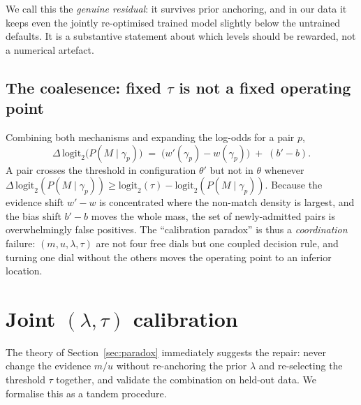 \documentclass[conference]{IEEEtran}
\begin{document}
We call this the \emph{genuine residual}: it survives prior anchoring, and in our data it
keeps even the jointly re-optimised trained model slightly below the untrained defaults.
It is a substantive statement about which levels should be rewarded, not a numerical
artefact.

\subsection{The coalesence: fixed $\tau$ is not a fixed operating point}
Combining both mechanisms and expanding the log-odds for a pair $p$,
\begin{equation}
\Delta\,\mathrm{logit}_2\bigl(P(M\mid\gamma_p)\bigr)
\;=\;\bigl(w'(\gamma_p)-w(\gamma_p)\bigr)\;+\;(b'-b).
\label{eq:delta}
\end{equation}
A pair crosses the threshold in configuration $\theta'$ but not in $\theta$ whenever
$\Delta\,\mathrm{logit}_2(P(M\mid\gamma_p))\ge
\mathrm{logit}_2(\tau)-\mathrm{logit}_2(P(M\mid\gamma_p))$. Because the evidence shift
$w'-w$ is concentrated where the non-match density is largest, and the bias shift $b'-b$
moves the whole mass, the set of newly-admitted pairs is overwhelmingly false positives.
The ``calibration paradox'' is thus a \emph{coordination} failure: $(m,u,\lambda,\tau)$ are
not four free dials but one coupled decision rule, and turning one dial without the others
moves the operating point to an inferior location.

\section{Joint $(\lambda,\tau)$ calibration}
\label{sec:alg}
The theory of Section~\ref{sec:paradox} immediately suggests the repair: never change the
evidence $m/u$ without re-anchoring the prior $\lambda$ and re-selecting the threshold
$\tau$ together, and validate the combination on held-out data. We formalise this as a
tandem procedure.
\end{document}
